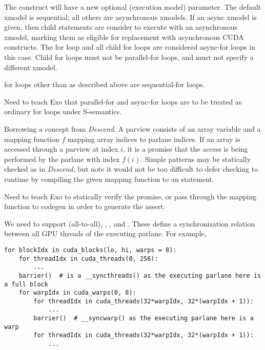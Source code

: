 \filbreak
{} The  construct will have a new optional  (execution model) parameter.
The default xmodel is sequential; all others are asynchronous xmodels.
If an async xmodel is given, then child statements are consider to execute with an asynchronous xmodel, marking them as eligible for replacement with asynchronous CUDA constructs.
The for loop and all child for loops are considered async-for loops in this case.
Child for loops must not be parallel-for loops, and must not specify a different xmodel.

\filbreak
{} for loops other than as described above are sequential-for loops.

 Need to teach Exo that parallel-for and async-for loops are to be treated as ordinary for loops under S-semantics.

\filbreak
{} Borrowing a concept from \textit{Descend}.
A parview consists of an array variable and a mapping function $f$ mapping array indices to parlane indices.
If an array is accessed through a parview at index $i$, it is a promise that the access is being performed by the parlane with index $f(i)$.
Simple patterns may be statically checked as in \textit{Descend}, but note it would not be too difficult to defer checking to runtime by compiling the given mapping function to an  statement.

 Need to teach Exo to statically verify the promise, or pass through the mapping function to codegen in order to generate the assert.

\filbreak
{} We need to support  (all-to-all), , , and .
These define a synchronization relation between all GPU threads of the executing parlane.
For example,

\filbreak
{\color{lightttColor}
\begin{verbatim}
for blockIdx in cuda_blocks(lo, hi, warps = 8):
    for threadIdx in cuda_threads(0, 256):
        ...
    barrier()  # is a __syncthreads() as the executing parlane here is a full block
    for warpIdx in cuda_warps(0, 8):
        for threadIdx in cuda_threads(32*warpIdx, 32*(warpIdx + 1)):
            ...
        barrier()  # __syncwarp() as the executing parlane here is a warp
        for threadIdx in cuda_threads(32*warpIdx, 32*(warpIdx + 1)):
            ...
\end{verbatim}
}


